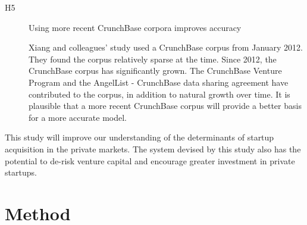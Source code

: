 \documentclass[../thesis/thesis.tex]{subfiles}
\begin{document}
\begin{description}
\item[H5] Using more recent CrunchBase corpora improves accuracy

Xiang and colleagues' study used a CrunchBase corpus from January 2012. They found the corpus relatively sparse at the time. Since 2012, the CrunchBase corpus has significantly grown. The CrunchBase Venture Program and the AngelList - CrunchBase data sharing agreement have contributed to the corpus, in addition to natural growth over time. It is plausible that a more recent CrunchBase corpus will provide a better basis for a more accurate model.

\end{description}

This study will improve our understanding of the determinants of startup acquisition in the private markets. The system devised by this study also has the potential to de-risk venture capital and encourage greater investment in private startups.

\section*{Method}
\end{document}
